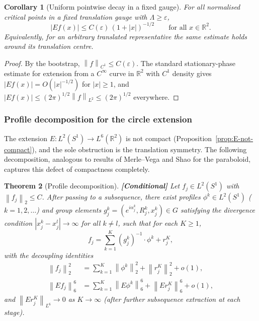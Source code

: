 \documentclass[12pt]{article}
\newtheorem{theorem}{Theorem}[section]
\newtheorem{corollary}[theorem]{Corollary}
\theoremstyle{definition}
\theoremstyle{remark}
\newcommand{\R}{\mathbb{R}}
\newcommand{\norm}[1]{\left\|#1\right\|}
\newcommand{\conditional}{\textbf{\color{orange}[Conditional]}}
\begin{document}
\begin{corollary}[Uniform pointwise decay in a fixed gauge]
  \label{cor:uniform-decay}
  For all normalised critical points in a fixed translation gauge with
  $\Lambda\geq\varepsilon$,
  \[
    |Ef(x)|\leq C(\varepsilon)\,(1+|x|)^{-1/2}
    \qquad\text{for all }x\in\R^2.
  \]
  Equivalently, for an arbitrary translated representative the same
  estimate holds around its translation centre.
\end{corollary}
\begin{proof}
  By the bootstrap, $\norm{f}_{C^1}\leq C(\varepsilon)$.  The standard
  stationary-phase estimate for extension from a $C^\infty$ curve in
  $\R^2$ with $C^1$ density gives $|Ef(x)|=O(|x|^{-1/2})$
  for $|x|\geq 1$, and
  $|Ef(x)|\leq(2\pi)^{1/2}\norm{f}_{L^2}\leq(2\pi)^{1/2}$ everywhere.
\end{proof}

\subsubsection{Profile decomposition for the circle extension}

The extension $E:L^2(S^1)\to L^6(\R^2)$ is not compact
(Proposition~\ref{prop:E-not-compact}), and the sole obstruction is
the translation symmetry.  The following decomposition, analogous to
results of Merle--Vega and Shao for the paraboloid, captures this
defect of compactness completely.

\begin{theorem}[Profile decomposition]
  \label{thm:profile-decomp}
  \conditional\quad
  Let $f_j\in L^2(S^1)$ with $\norm{f_j}_2\leq C$.  After passing
  to a subsequence, there exist profiles $\phi^k\in L^2(S^1)$
  ($k=1,2,\ldots$) and group elements
  $g_j^k=(e^{i\alpha_j^k},R_j^k,x_j^k)\in G$ satisfying the
  \emph{divergence condition}
  $|x_j^k-x_j^l|\to\infty$ for all $k\neq l$,
  such that for each $K\geq 1$,
  \begin{equation}\label{eq:profile-decomp}
    f_j = \sum_{k=1}^K(g_j^k)^{-1}\cdot\phi^k + r_j^K,
  \end{equation}
  with the decoupling identities
  \begin{align}
    \norm{f_j}_2^2
    &= \textstyle\sum_{k=1}^K\norm{\phi^k}_2^2
      + \norm{r_j^K}_2^2 + o(1),
    \label{eq:L2-decouple}\\
    \norm{Ef_j}_6^6
    &= \textstyle\sum_{k=1}^K\norm{E\phi^k}_6^6
      + \norm{Er_j^K}_6^6 + o(1),
    \label{eq:L6-decouple}
  \end{align}
  and $\norm{Er_j^K}_{L^6}\to 0$ as $K\to\infty$ (after further
  subsequence extraction at each stage).
\end{theorem}
\end{document}

